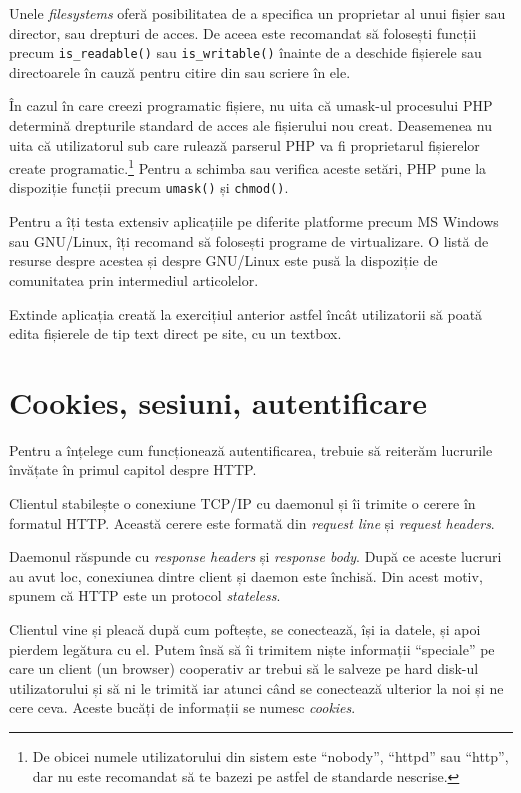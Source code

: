 Unele \textit{filesystems} oferă posibilitatea de a specifica 
un proprietar al unui fișier sau director, sau drepturi de acces.
De aceea este recomandat să folosești funcții precum \texttt{is\_readable()}
sau \texttt{is\_writable()} \^inainte de a deschide fișierele
sau directoarele \^in cauză pentru citire din sau scriere \^in ele.

\^In cazul \^in care creezi programatic fișiere, nu uita că
umask-ul procesului PHP determină drepturile standard de acces
ale fișierului nou creat. Deasemenea nu uita că utilizatorul sub
care rulează parserul PHP va fi proprietarul fișierelor create
programatic.\footnote{De obicei numele utilizatorului din sistem
este ``nobody'', ``httpd'' sau ``http'', dar
nu este recomandat să te bazezi pe astfel de standarde nescrise.}
Pentru a schimba sau verifica aceste setări, PHP pune la dispoziție
funcții precum \texttt{umask()} și \texttt{chmod()}.

Pentru a \^iți testa extensiv aplicațiile pe diferite platforme
precum MS Windows sau GNU/Linux, \^iți recomand să folosești
programe de virtualizare. O listă de resurse despre acestea
și despre GNU/Linux este pusă la dispoziție de comunitatea
{\phpro} prin intermediul articolelor.


\begin{Exercise}[title={Remote file storage cu editare text on-site},difficulty=1]
Extinde aplicația creată la exercițiul anterior astfel încât
utilizatorii să poată edita fișierele de tip text direct
pe site, cu un textbox.
\end{Exercise}

\section{Cookies, sesiuni, autentificare}
Pentru a \^ințelege cum funcționează autentificarea, trebuie să
reiterăm lucrurile \^invățate \^in primul capitol despre HTTP.

Clientul stabilește o conexiune TCP/IP cu daemonul și \^ii
trimite o cerere \^in formatul HTTP. Această cerere
este formată din \textit{request line} și \textit{request headers}.

Daemonul răspunde cu \textit{response headers} și \textit{response body}.
După ce aceste lucruri au avut loc, conexiunea dintre client și daemon
este \^inchisă. Din acest motiv, spunem că HTTP este un protocol \textsl{stateless}.

Clientul vine și pleacă după cum poftește, se conectează, \^iși ia datele,
și apoi pierdem legătura cu el. Putem \^insă să \^ii trimitem niște informații ``speciale''
pe care un client (un browser) cooperativ ar trebui să le salveze pe hard disk-ul
utilizatorului și să ni le trimită iar atunci c\^and se conectează ulterior
la noi și ne cere ceva. Aceste bucăți de informații se numesc \textsl{cookies}.

